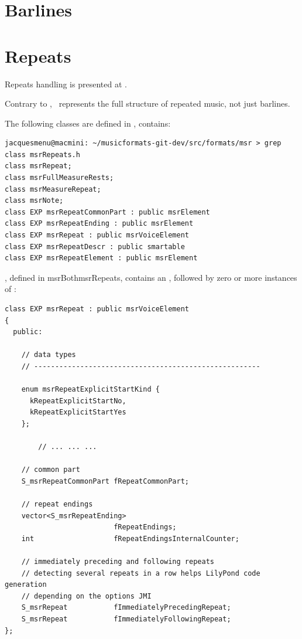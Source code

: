 \section{Barlines}\label{Barlines}

\section{Repeats}\label{Repeats}

Repeats handling is presented at .

Contrary to \mxml, \mf\ represents the full structure of repeated music, not just barlines.

The following classes are defined in , contains:
\begin{lstlisting}[language=Terminal]
jacquesmenu@macmini: ~/musicformats-git-dev/src/formats/msr > grep class msrRepeats.h
class msrRepeat;
class msrFullMeasureRests;
class msrMeasureRepeat;
class msrNote;
class EXP msrRepeatCommonPart : public msrElement
class EXP msrRepeatEnding : public msrElement
class EXP msrRepeat : public msrVoiceElement
class EXP msrRepeatDescr : public smartable
class EXP msrRepeatElement : public msrElement
\end{lstlisting}

, defined in msrBoth{msrRepeats}, contains an , followed by zero or more instances of :
\begin{lstlisting}[language=CPlusPlus]
class EXP msrRepeat : public msrVoiceElement
{
  public:

    // data types
    // ------------------------------------------------------

    enum msrRepeatExplicitStartKind {
      kRepeatExplicitStartNo,
      kRepeatExplicitStartYes
    };

		// ... ... ...

    // common part
    S_msrRepeatCommonPart fRepeatCommonPart;

    // repeat endings
    vector<S_msrRepeatEnding>
                          fRepeatEndings;
    int                   fRepeatEndingsInternalCounter;

    // immediately preceding and following repeats
    // detecting several repeats in a row helps LilyPond code generation
    // depending on the options JMI
    S_msrRepeat           fImmediatelyPrecedingRepeat;
    S_msrRepeat           fImmediatelyFollowingRepeat;
};
\end{lstlisting}

